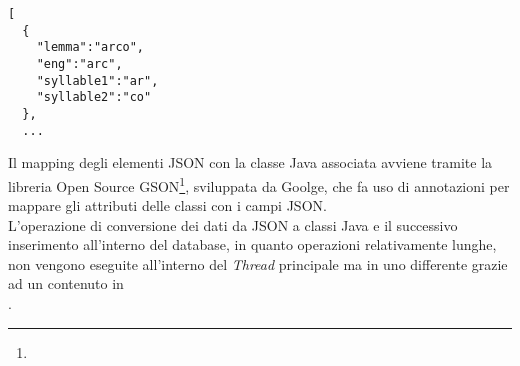 \begin{lstlisting}[float, caption=Porzione del file \code{words.json}, label=lst:words_json]
[
  {
    "lemma":"arco",
    "eng":"arc",
    "syllable1":"ar",
    "syllable2":"co"
  },
  ...
\end{lstlisting}

Il mapping degli elementi JSON con la classe Java associata avviene tramite la libreria Open Source GSON\footnote{}, sviluppata da Goolge, che fa uso di annotazioni per mappare gli attributi delle classi con i campi JSON.\\
L'operazione di conversione dei dati da JSON a classi Java e il successivo inserimento all'interno del database, in quanto operazioni relativamente lunghe, non vengono eseguite all'interno del \textit{Thread} principale ma in uno differente grazie ad un  contenuto in \\. 

